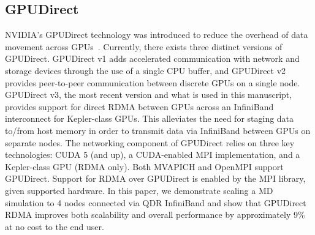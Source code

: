 \documentclass[10pt]{sigplanconf}
\begin{document}
\subsection{GPUDirect}
NVIDIA's GPUDirect technology was introduced to reduce the overhead of data movement across GPUs~\cite{GPUDirect, shainer2011development}.  
Currently, there exists three distinct versions of GPUDirect.  GPUDirect v1 adds accelerated communication with network and storage devices through the use of a single CPU buffer, and GPUDirect v2 provides peer-to-peer communication between discrete GPUs on a single node.  GPUDirect v3, the most recent version and what is used in this manuscript, provides support for direct RDMA between GPUs across an InfiniBand interconnect for Kepler-class GPUs. This alleviates the need for staging data to/from host memory in order to transmit data via InfiniBand between GPUs on separate nodes. 
The networking component of GPUDirect relies on three key technologies: CUDA 5
(and up), a CUDA-enabled MPI implementation, and a Kepler-class GPU (RDMA only).
Both MVAPICH and OpenMPI support GPUDirect.  Support for RDMA over GPUDirect is
enabled by the MPI library, given supported hardware.
In this paper, %
we demonstrate scaling a MD simulation to 4 nodes connected via QDR InfiniBand
and show that GPUDirect RDMA improves both scalability and overall performance
by approximately 9\% at no cost to the end user.









\end{document}
